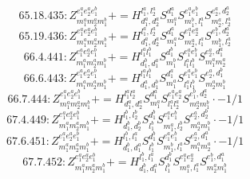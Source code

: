 \documentclass[letterpaper,10pt,fleqn,leqno,onecolumn]{article}
\begin{document}
\begin{equation} \;\;\;\;\;\;  65.18.435: Z^{e_{1}^{a}e_{2}^{a}e_{1}^{b}}_{m_{1}^{a}m_{2}^{a}m_{1}^{b}}+=H^{l_{1}^{a},l_{2}^{a}}_{d_{1}^{a},d_{2}^{a}}S^{d_{1}^{a}}_{m_{1}^{a}}S^{e_{1}^{a}e_{1}^{b}}_{m_{1}^{b},l_{1}^{a}}S^{e_{2}^{a},d_{2}^{a}}_{m_{2}^{a},l_{2}^{a}} \end{equation}
\begin{equation} \;\;\;\;\;\;  65.19.436: Z^{e_{1}^{a}e_{2}^{a}e_{1}^{b}}_{m_{1}^{a}m_{2}^{a}m_{1}^{b}}+=H^{l_{1}^{a},l_{2}^{a}}_{d_{1}^{a},d_{2}^{a}}S^{d_{1}^{a}}_{m_{1}^{a}}S^{e_{1}^{a}e_{2}^{a}}_{m_{2}^{a},l_{1}^{a}}S^{e_{1}^{b},d_{2}^{a}}_{m_{1}^{b},l_{2}^{a}} \end{equation}
\begin{equation} \;\;\;\;\;\;  66.4.441: Z^{e_{1}^{a}e_{2}^{a}e_{1}^{b}}_{m_{1}^{a}m_{2}^{a}m_{1}^{b}}+=H^{l_{1}^{a}l_{1}^{b}}_{d_{1}^{b},d_{1}^{a}}S^{d_{1}^{b}}_{m_{1}^{b}}S^{e_{1}^{a}e_{1}^{b}}_{l_{1}^{a}l_{1}^{b}}S^{e_{2}^{a},d_{1}^{a}}_{m_{1}^{a}m_{2}^{a}} \end{equation}
\begin{equation} \;\;\;\;\;\;  66.6.443: Z^{e_{1}^{a}e_{2}^{a}e_{1}^{b}}_{m_{1}^{a}m_{2}^{a}m_{1}^{b}}+=H^{l_{1}^{a}l_{1}^{b}}_{d_{1}^{a},d_{1}^{b}}S^{d_{1}^{a}}_{m_{1}^{a}}S^{e_{1}^{a}e_{1}^{b}}_{l_{1}^{a}l_{1}^{b}}S^{e_{2}^{a},d_{1}^{b}}_{m_{2}^{a}m_{1}^{b}} \end{equation}
\begin{equation} \;\;\;\;\;\;  66.7.444: Z^{e_{1}^{a}e_{2}^{a}e_{1}^{b}}_{m_{1}^{a}m_{2}^{a}m_{1}^{b}}+=H^{l_{1}^{a}l_{2}^{a}}_{d_{1}^{a},d_{2}^{a}}S^{d_{1}^{a}}_{m_{1}^{a}}S^{e_{1}^{a}e_{2}^{a}}_{l_{1}^{a}l_{2}^{a}}S^{e_{1}^{b},d_{2}^{a}}_{m_{2}^{a}m_{1}^{b}}\cdot -1/1 \end{equation}
\begin{equation} \;\;\;\;\;\;  67.4.449: Z^{e_{1}^{a}e_{2}^{a}e_{1}^{b}}_{m_{1}^{a}m_{2}^{a}m_{1}^{b}}+=H^{l_{1}^{b},l_{2}^{b}}_{d_{1}^{b},d_{2}^{b}}S^{d_{1}^{b}}_{l_{1}^{b}}S^{e_{1}^{a}e_{1}^{b}}_{m_{1}^{a},l_{2}^{b}}S^{e_{2}^{a},d_{2}^{b}}_{m_{2}^{a}m_{1}^{b}}\cdot -1/1 \end{equation}
\begin{equation} \;\;\;\;\;\;  67.6.451: Z^{e_{1}^{a}e_{2}^{a}e_{1}^{b}}_{m_{1}^{a}m_{2}^{a}m_{1}^{b}}+=H^{l_{1}^{b},l_{1}^{a}}_{d_{1}^{b},d_{1}^{a}}S^{d_{1}^{b}}_{l_{1}^{b}}S^{e_{1}^{a}e_{1}^{b}}_{m_{1}^{b},l_{1}^{a}}S^{e_{2}^{a},d_{1}^{a}}_{m_{1}^{a}m_{2}^{a}}\cdot -1/1 \end{equation}
\begin{equation} \;\;\;\;\;\;  67.7.452: Z^{e_{1}^{a}e_{2}^{a}e_{1}^{b}}_{m_{1}^{a}m_{2}^{a}m_{1}^{b}}+=H^{l_{1}^{b},l_{1}^{a}}_{d_{1}^{b},d_{1}^{a}}S^{d_{1}^{b}}_{l_{1}^{b}}S^{e_{1}^{a}e_{2}^{a}}_{m_{1}^{a},l_{1}^{a}}S^{e_{1}^{b},d_{1}^{a}}_{m_{2}^{a}m_{1}^{b}} \end{equation}
\end{document}
